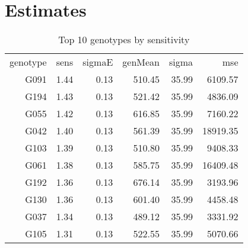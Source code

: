 \documentclass[a4paper,11pt]{article}\usepackage[]{graphicx}\usepackage[]{color}
\begin{document}
\clearpage

\section{Estimates}

\begin{table}[ht]
\begin{flushleft}
\caption{Top 10 genotypes by sensitivity} 
\label{topEstimates}
\begin{tabular}{rrrrrr}
 genotype & sens & sigmaE & genMean & sigma & mse \\ 
 G091 & 1.44 & 0.13 & 510.45 & 35.99 & 6109.57 \\ 
  G194 & 1.43 & 0.13 & 521.42 & 35.99 & 4836.09 \\ 
  G055 & 1.42 & 0.13 & 616.85 & 35.99 & 7160.22 \\ 
  G042 & 1.40 & 0.13 & 561.39 & 35.99 & 18919.35 \\ 
  G103 & 1.39 & 0.13 & 510.80 & 35.99 & 9408.33 \\ 
  G061 & 1.38 & 0.13 & 585.75 & 35.99 & 16409.48 \\ 
  G192 & 1.36 & 0.13 & 676.14 & 35.99 & 3193.96 \\ 
  G130 & 1.36 & 0.13 & 601.40 & 35.99 & 4458.48 \\ 
  G037 & 1.34 & 0.13 & 489.12 & 35.99 & 3331.92 \\ 
  G105 & 1.31 & 0.13 & 522.55 & 35.99 & 5070.66 \\ 
  \end{tabular}
\end{flushleft}
\end{table}
\end{document}

